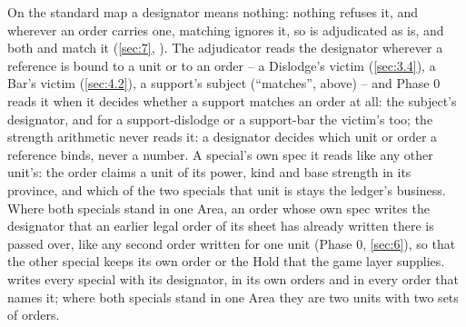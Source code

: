 \documentclass[12pt,a4paper]{article}
\begin{document}
On the standard map a designator means nothing: nothing refuses it, and wherever an order carries one, matching ignores it, so  is adjudicated as  is, and both  and  match it (\cref{sec:7}, ).
The adjudicator reads the designator wherever a reference is bound to a unit or to an order -- a Dislodge's victim (\cref{sec:3.4}), a Bar's victim (\cref{sec:4.2}), a support's subject (``matches'', above) -- and Phase 0 reads it when it decides whether a support matches an order at all: the subject's designator, and for a support-dislodge or a support-bar the victim's too; the strength arithmetic never reads it: a designator decides which unit or order a reference binds, never a number.
A special's own spec it reads like any other unit's: the order claims a unit of its power, kind and base strength in its province, and which of the two specials that unit is stays the ledger's business.
Where both specials stand in one Area, an order whose own spec writes the designator that an earlier legal order of its sheet has already written there is passed over, like any second order written for one unit (Phase 0, \cref{sec:6}), so that the other special keeps its own order or the Hold that the game layer supplies.
 writes every special with its designator, in its own orders and in every order that names it; where both specials stand in one Area they are two units with two sets of orders.
\end{document}

